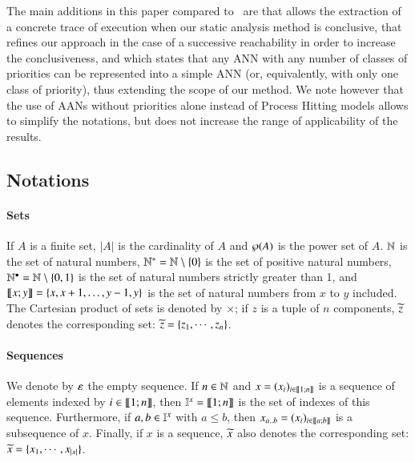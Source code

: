 The main additions in this paper compared to~\cite{FPMR13-CS2Bio} are
 that allows the extraction of a concrete trace of execution
when our static analysis method is conclusive,
 that refines our approach in the case
of a successive reachability in order to increase the conclusiveness,
and  which states that any ANN
with any number of classes of priorities
can be represented into a simple ANN
(or, equivalently, with only one class of priority),
thus extending the scope of our method.
We note however that the use of AANs without priorities alone
instead of Process Hitting models
allows to simplify the notations, but does not increase
the range of applicability of the results.



\subsection*{Notations}
\label{notations}

\paragraph*{Sets}
If $A$ is a finite set,
$|A|$ is the cardinality of $A$
and $\wp(A)$ is the power set of $A$.
$\mathbb{N}$ is the set of natural numbers,
$\mathbb{N}^* = \mathbb{N} \setminus \{ 0 \}$ is the set of positive natural numbers,
$\mathbb{N}^\bullet = \mathbb{N} \setminus \{ 0, 1 \}$ is the set of natural numbers strictly greater than 1,
and $\llbracket x; y \rrbracket = \{ x, x+1, \dots, y-1, y \}$ is the set of natural numbers from $x$ to $y$ included.
The Cartesian product of sets is denoted by $\times$;
if $z$ is a tuple of $n$ components, $\widetilde{z}$ denotes the corresponding set:
$\widetilde{z} = \{z_1, \cdots, z_n\}$.

\paragraph*{Sequences}
We denote by $\varepsilon$ the empty sequence.
If $n \in \mathbb{N}$ and
$x = (x_i)_{i \in \llbracket 1; n \rrbracket}$ is a sequence of elements indexed by $i \in \llbracket 1; n \rrbracket$,
then $\mathbb{I}^{x} = \llbracket 1; n \rrbracket$ is the set of indexes of this sequence.
Furthermore, if $a, b \in \mathbb{I}^{x}$ with $a \leq b$,
then $x_{a..b} = (x_i)_{i \in \llbracket a; b \rrbracket}$ is a subsequence of $x$.
Finally, if $x$ is a sequence, $\widetilde{x}$ also denotes the corresponding set:
$\widetilde{x} = \{x_1, \cdots, x_{|x|}\}$.

